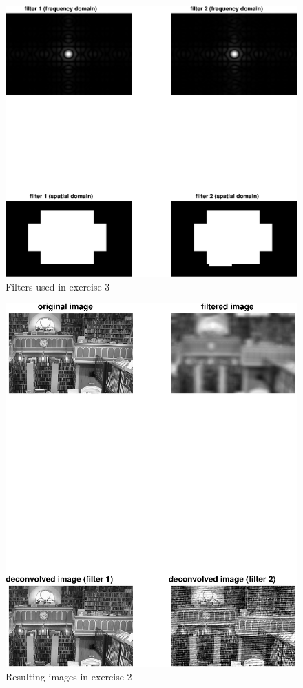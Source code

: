 \documentclass{article}
\begin{document}
\begin{figure}[H]
  \begin{center}
    \includegraphics[width=\textwidth]{./images/ex03_filters.eps}
    \caption{Filters used in exercise 3}
    \label{ex03_filters}
  \end{center}
\end{figure}

\begin{figure}[H]
  \begin{center}
    \includegraphics[width=\textwidth]{./images/ex03_images.eps}
    \caption{Resulting images in exercise 2}
    \label{ex03_images}
  \end{center}
\end{figure}
\end{document}
